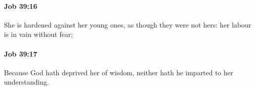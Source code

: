		\paragraph{Job 39:16} %
			\label{JOB-39-16}

			She is hardened against her young ones, as though they were not hers: her labour is in vain without fear;


		\paragraph{Job 39:17} %
			\label{JOB-39-17}

			Because God hath deprived her of wisdom, neither hath he imparted to her understanding.



